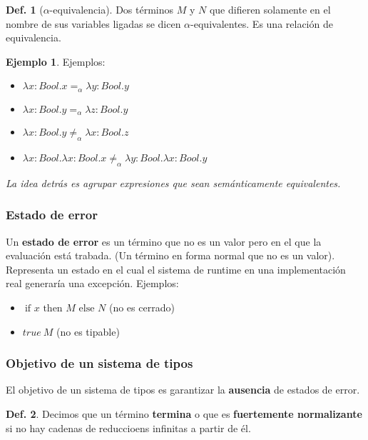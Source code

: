 \documentclass{report}
\theoremstyle{definition} %
\newtheorem{definition}{Def.}[chapter]
\newtheorem*{example*}{Ejemplo}
\newcommand{\aeq}{=_\alpha}
\newcommand{\naeq}{\neq_\alpha}
\newcommand{\ifte}[3]{\ \text{if } #1 \text{ then } #2 \text{ else } #3}
\newcommand{\abs}[3]{\lambda #1 : #2 . #3}
\newcommand{\app}[2]{#1 \ #2} %
\begin{document}
\begin{definition}[$\alpha$-equivalencia]
    Dos términos $M$ y $N$ que difieren solamente en el nombre de sus variables
    ligadas se dicen $\alpha$-equivalentes. Es una relación de equivalencia.
    
    \begin{example*} Ejemplos:
        \begin{itemize}
            \item $\abs{x}{Bool}{x} \aeq \abs{y}{Bool}{y}$
            \item $\abs{x}{Bool}{y} \aeq \abs{z}{Bool}{y}$
            \item $\abs{x}{Bool}{y} \naeq \abs{x}{Bool}{z}$
            \item $\abs{x}{Bool}{\abs{x}{Bool}{x}} \naeq \abs{y}{Bool}{\abs{x}{Bool}{y}}$
        \end{itemize}        
    \end{example*}
\end{definition}

\textit{La idea detrás es agrupar expresiones que sean semánticamente equivalentes.}

\subsubsection{Estado de error}

Un \textbf{estado de error} es un término que no es un valor pero en el que la
evaluación está trabada. (Un término en forma normal que no es un valor).
Representa un estado en el cual el sistema de runtime en una implementación real
generaría una excepción. Ejemplos:

\begin{itemize}
    \item $\ifte{x}{M}{N}$ (no es cerrado)
    \item $\app{true}{M}$ (no es tipable)
\end{itemize}

\subsubsection{Objetivo de un sistema de tipos}

El objetivo de un sistema de tipos es garantizar la \textbf{ausencia} de estados
de error.

\begin{definition}
    Decimos que un término \textbf{termina} o que es \textbf{fuertemente
normalizante} si no hay cadenas de reduccioens infinitas a partir de él.
\end{definition}
\end{document}
